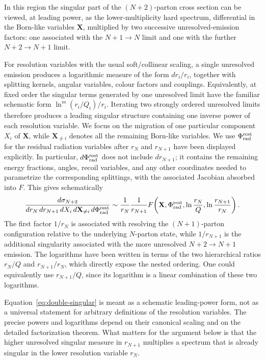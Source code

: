 \documentclass[11pt]{article}
\newcommand{\rn}{r_N}
\newcommand{\rnp}{r_{N+1}}
\newcommand{\Ph}{\Phi}
\begin{document}
In this region the singular part of the \((N+2)\)-parton cross section can be viewed, at leading power, as
the lower-multiplicity hard spectrum, differential in the Born-like variables \(\mathbf X\), multiplied by
two successive unresolved-emission factors: one associated with the \(N+1\to N\) limit and one with the
further \(N+2\to N+1\) limit.

For resolution variables with the usual soft/collinear scaling, a single unresolved emission produces a
logarithmic measure of the form \(d r_i/r_i\), together with splitting kernels, angular variables, colour
factors and couplings. Equivalently, at fixed order the singular terms generated by one unresolved limit
have the familiar schematic form \(\ln^m(r_i/Q_i)/r_i\). Iterating two strongly ordered unresolved limits
therefore produces a leading singular structure containing one inverse power of each resolution variable.
We focus on the migration of one particular component \(X_i\) of \(\mathbf X\), while
\(\mathbf X_{\neq i}\) denotes all the remaining Born-like variables. We use
\(\Ph_{\rm rad}^{\rm rest}\) for the residual radiation variables after \(\rn\) and \(\rnp\) have been
displayed explicitly. In particular, \(d\Ph_{\rm rad}^{\rm rest}\) does not include \(d\rnp\); it contains
the remaining energy fractions, angles, recoil variables, and any other coordinates needed to parametrize
the corresponding splittings, with the associated Jacobian absorbed into \(F\). This gives schematically
\begin{equation}
\frac{d\sigma_{N+2}}
{d\rn\,d\rnp\,dX_i\,d\mathbf X_{\neq i}\,d\Ph_{\rm rad}^{\rm rest}}
\sim
\frac{1}{\rn}\frac{1}{\rnp}
F\!\left(
\mathbf X,\Ph_{\rm rad}^{\rm rest},
\ln\frac{\rn}{Q},
\ln\frac{\rnp}{\rn}
\right).
\label{eq:double-singular}
\end{equation}
The first factor \(1/\rn\) is associated with resolving the \((N+1)\)-parton configuration relative to the
underlying \(N\)-parton state, while \(1/\rnp\) is the additional singularity associated with the more
unresolved \(N+2\to N+1\) emission. The logarithms have been written in terms of the two hierarchical ratios
\(\rn/Q\) and \(\rnp/\rn\), which directly expose the nested ordering. One could equivalently use
\(\rnp/Q\), since its logarithm is a linear combination of these two logarithms.

Equation~\eqref{eq:double-singular} is meant as a schematic leading-power form, not as a universal statement
for arbitrary definitions of the resolution variables. The precise powers and logarithms depend on their
canonical scaling and on the detailed factorization theorem. What matters for the argument below is that the
higher unresolved singular measure in \(\rnp\) multiplies a spectrum that is already singular in the lower
resolution variable \(\rn\).
\end{document}
